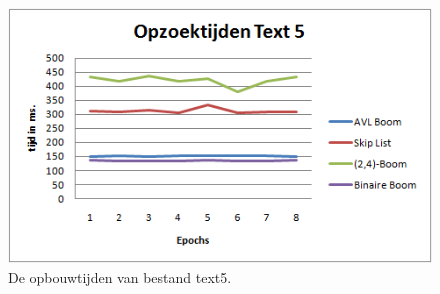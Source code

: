 \begin{figure}[h]
	\centering
		\includegraphics[width=\textwidth]{chap7/zoektijdtext5}
		\caption{De opbouwtijden van bestand text5.}
	\label{fig:zoektext5}
\end{figure}


